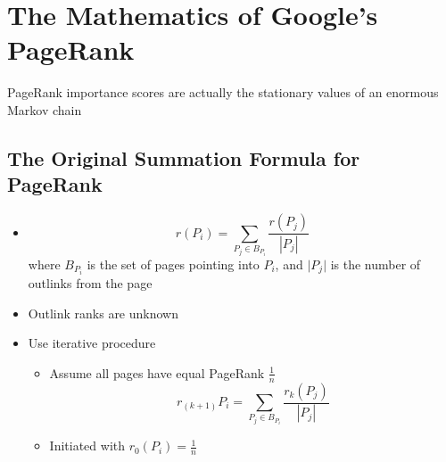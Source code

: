 \documentclass[11pt]{report}
\begin{document}
\chapter{The Mathematics of Google's PageRank}
PageRank importance scores are actually the stationary values of an enormous Markov chain
\section{The Original Summation Formula for PageRank}
\begin{itemize}
\item \begin{equation}
r(P_i) = \displaystyle \sum_{P_j\in B_{P_i }} \frac{r(P_j)}{|P_j|} 
\end{equation} where $B_{P_i }$ is the set of pages pointing into $P_i$, and $\vert P_j \vert $ is the number of outlinks from the page 
\item Outlink ranks are unknown 
\item Use iterative procedure
\begin{itemize}
\item Assume all pages have equal PageRank $\frac{1}{n}$ 
\begin{equation}
r_{(k+1)}P_i = \displaystyle \sum_{P_j\in B_{P_i }}\frac{r_k(P_j)}{|P_j|}
\end{equation}
\item Initiated with \(r_0(P_i) = \frac{1}{n}\)
\end{itemize}
\end{itemize}
\end{document}
